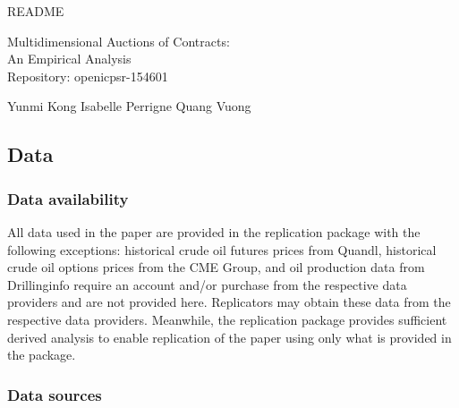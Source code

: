 \documentclass[12pt,english]{article}
\begin{document}
	\begin{center}
		{\Large{}README}{\Large\par}
		\par\end{center}
	
	\begin{center}
		{\Large{}Multidimensional Auctions of Contracts:}\\
		{\Large{}An Empirical Analysis}\\
		{\Large{}Repository: openicpsr-154601}{\Large\par}
		\par\end{center}
	
	\begin{center}
		Yunmi Kong \hspace*{1cm} Isabelle Perrigne \hspace*{1cm} Quang Vuong
		\vspace{1cm}
		\par\end{center}
	
	\subsection*{Data }
	
	\subsubsection*{Data availability}
	
	All data used in the paper are provided in the replication package
	with the following exceptions: historical crude oil futures prices
	from Quandl, historical crude oil options prices from the CME Group,
	and oil production data from Drillinginfo require an account and/or
	purchase from the respective data providers and are not provided here.
	Replicators may obtain these data from the respective data providers.
	Meanwhile, the replication package provides sufficient derived analysis
	to enable replication of the paper using only what is provided in
	the package.
	
	\subsubsection*{Data sources}
	
\end{document}
